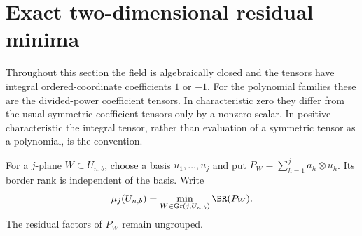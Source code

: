 
\section{Exact two-dimensional residual minima}

Throughout this section the field is algebraically closed and the tensors
have integral ordered-coordinate coefficients \(1\) or \(-1\). For the
polynomial families these are the divided-power coefficient tensors.
In characteristic zero they differ from the usual symmetric coefficient
tensors only by a nonzero scalar. In positive characteristic the integral
tensor, rather than evaluation of a symmetric tensor as a polynomial, is
the convention.

For a \(j\)-plane \(W\subset U_{n,b}\), choose a basis \(u_1,\ldots,u_j\)
and put \(P_W=\sum_{h=1}^j a_h\otimes u_h\). Its border rank is independent
of the basis. Write
\[
 \mu_j(U_{n,b})=\min_{W\in\operatorname{Gr}(j,U_{n,b})}\BR(P_W).
\]
The residual factors of \(P_W\) remain ungrouped.

